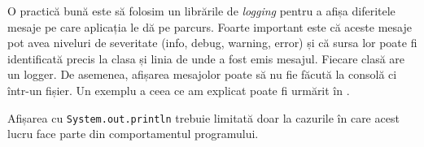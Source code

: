 O practică bună este să folosim un librările de \textit{logging} pentru a afișa diferitele mesaje pe care aplicația le dă pe parcurs. Foarte important este că aceste mesaje pot avea niveluri de severitate (info, debug, warning, error) și că sursa lor poate fi identificată precis la clasa și linia de unde a fost emis mesajul. Fiecare clasă are un logger. De asemenea, afișarea mesajolor poate să nu fie făcută la consolă ci într-un fișier. Un exemplu a ceea ce am explicat poate fi urmărit în .


\lstset{language=make}
\lstset{caption=Exemplu de logging realizat de Apache Log4j,  label=lst:logging}


Afișarea cu \texttt{System.out.println} trebuie limitată doar la cazurile în care acest lucru face parte din comportamentul programului.






















